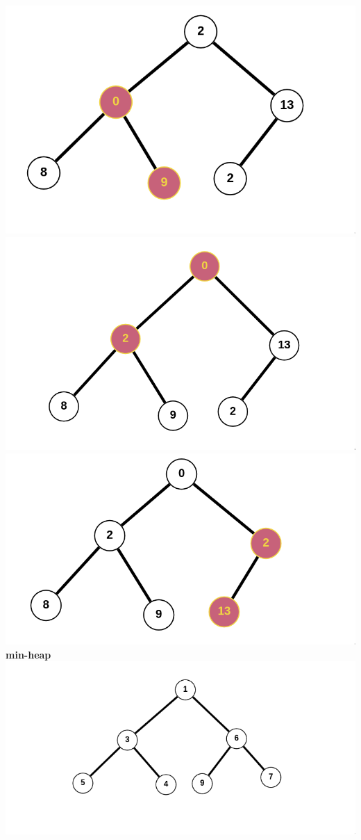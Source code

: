 \documentclass[12pt,twoside]{article}
\begin{document}
\begin{problems}
\begin{problemparts}
\includegraphics[width=1.0\textwidth]{./heaps/img4.png}
\includegraphics[width=1.0\textwidth]{./heaps/img5.png}
\includegraphics[width=1.0\textwidth]{./heaps/img6.png}
\problempart %
\textbf{min-heap} \\
\includegraphics[width=1.0\textwidth]{./heaps/img7.png}
\end{problemparts}


\end{problems}
\end{document}
